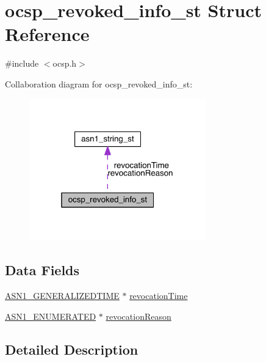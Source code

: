 \hypertarget{structocsp__revoked__info__st}{}\section{ocsp\+\_\+revoked\+\_\+info\+\_\+st Struct Reference}
\label{structocsp__revoked__info__st}


{\ttfamily \#include $<$ocsp.\+h$>$}



Collaboration diagram for ocsp\+\_\+revoked\+\_\+info\+\_\+st\+:\nopagebreak
\begin{figure}[H]
\begin{center}
\leavevmode
\includegraphics[width=217pt]{structocsp__revoked__info__st__coll__graph}
\end{center}
\end{figure}
\subsection*{Data Fields}
\begin{DoxyCompactItemize}
\item 
\hyperlink{crypto_2ossl__typ_8h_abd19ea5b527807ce3a516e6a41440f84}{A\+S\+N1\+\_\+\+G\+E\+N\+E\+R\+A\+L\+I\+Z\+E\+D\+T\+I\+ME} $\ast$ \hyperlink{structocsp__revoked__info__st_afb1fd371babae90eb6b01876d0336fc4}{revocation\+Time}
\item 
\hyperlink{crypto_2ossl__typ_8h_a4b87b1c33899eb49377f298e8a8b9850}{A\+S\+N1\+\_\+\+E\+N\+U\+M\+E\+R\+A\+T\+ED} $\ast$ \hyperlink{structocsp__revoked__info__st_a668b236e63cfc1ec00f67bfa7eb2c3b9}{revocation\+Reason}
\end{DoxyCompactItemize}


\subsection{Detailed Description}


